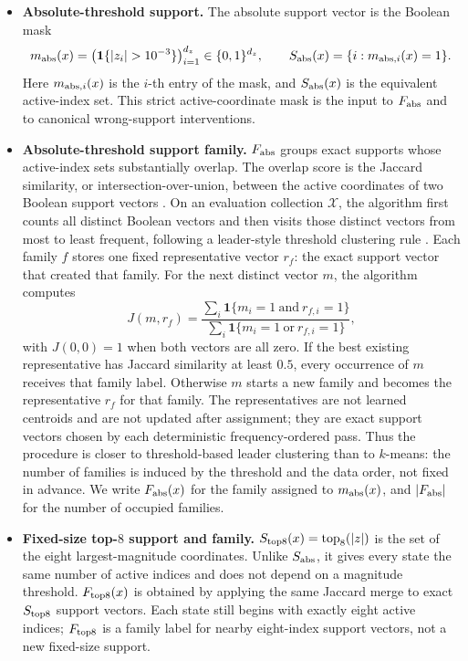\documentclass[11pt]{article}
\theoremstyle{plain}
\theoremstyle{definition}
\begin{document}
\begin{itemize}
  \item \textbf{Absolute-threshold support.} The absolute support vector is the Boolean mask
  \[
    m_{\rm abs}(x)=\bigl(\mathbf{1}\{|z_i|>10^{-3}\}\bigr)_{i=1}^{d_z}\in\{0,1\}^{d_z},
    \qquad
    S_{\rm abs}(x)=\{i:m_{{\rm abs},i}(x)=1\}.
  \]
  Here \(m_{{\rm abs},i}(x)\) is the \(i\)-th entry of the mask, and \(S_{\rm abs}(x)\) is the equivalent active-index set. This strict active-coordinate mask is the input to \(F_{\rm abs}\) and to canonical wrong-support interventions.
  \item \textbf{Absolute-threshold support family.} \(F_{\rm abs}\) groups exact supports whose active-index sets substantially overlap. The overlap score is the Jaccard similarity, or intersection-over-union, between the active coordinates of two Boolean support vectors \citep{jaccard_etude_1901}. On an evaluation collection \(\mathcal X\), the algorithm first counts all distinct Boolean vectors and then visits those distinct vectors from most to least frequent, following a leader-style threshold clustering rule \citep{hartigan_clustering_1975}. Each family \(f\) stores one fixed representative vector \(r_f\): the exact support vector that created that family. For the next distinct vector \(m\), the algorithm computes
  \[
    J(m,r_f)=
    \frac{\sum_i \mathbf{1}\{m_i=1\ \text{and}\ r_{f,i}=1\}}
         {\sum_i \mathbf{1}\{m_i=1\ \text{or}\ r_{f,i}=1\}},
  \]
  with \(J(0,0)=1\) when both vectors are all zero. If the best existing representative has Jaccard similarity at least \(0.5\), every occurrence of \(m\) receives that family label. Otherwise \(m\) starts a new family and becomes the representative \(r_f\) for that family. The representatives are not learned centroids and are not updated after assignment; they are exact support vectors chosen by each deterministic frequency-ordered pass. Thus the procedure is closer to threshold-based leader clustering than to \(k\)-means: the number of families is induced by the threshold and the data order, not fixed in advance. We write \(F_{\rm abs}(x)\) for the family assigned to \(m_{\rm abs}(x)\), and \(|F_{\rm abs}|\) for the number of occupied families.
  \item \textbf{Fixed-size top-\(8\) support and family.} \(S_{\rm top8}(x)=\operatorname{top}_8(|z|)\) is the set of the eight largest-magnitude coordinates. Unlike \(S_{\rm abs}\), it gives every state the same number of active indices and does not depend on a magnitude threshold. \(F_{\rm top8}(x)\) is obtained by applying the same Jaccard merge to exact \(S_{\rm top8}\) support vectors. Each state still begins with exactly eight active indices; \(F_{\rm top8}\) is a family label for nearby eight-index support vectors, not a new fixed-size support.
\end{itemize}
\end{document}
